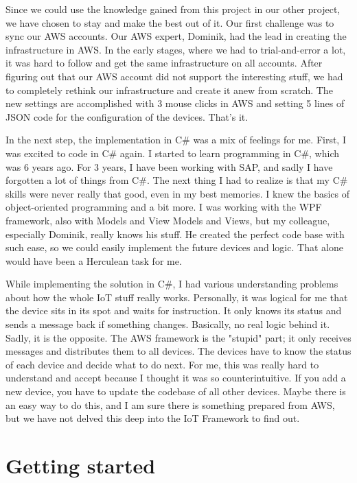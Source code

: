 Since we could use the knowledge gained from this project in our other project, we have chosen to stay and make the best out of it. 
Our first challenge was to sync our AWS accounts. 
Our AWS expert, Dominik, had the lead in creating the infrastructure in AWS. 
In the early stages, where we had to trial-and-error a lot, it was hard to follow and get the same infrastructure on all accounts. 
After figuring out that our AWS account did not support the interesting stuff, we had to completely rethink our infrastructure and create it anew from scratch. 
The new settings are accomplished with 3 mouse clicks in AWS and setting 5 lines of JSON code for the configuration of the devices. That's it.

In the next step, the implementation in C\# was a mix of feelings for me. 
First, I was excited to code in C\# again. 
I started to learn programming in C\#, which was 6 years ago. 
For 3 years, I have been working with SAP, and sadly I have forgotten a lot of things from C\#. 
The next thing I had to realize is that my C\# skills were never really that good, even in my best memories. 
I knew the basics of object-oriented programming and a bit more. 
I was working with the WPF framework, also with Models and View Models and Views, but my colleague, especially Dominik, really knows his stuff. 
He created the perfect code base with such ease, so we could easily implement the future devices and logic. 
That alone would have been a Herculean task for me.

While implementing the solution in C\#, I had various understanding problems about how the whole IoT stuff really works. 
Personally, it was logical for me that the device sits in its spot and waits for instruction. 
It only knows its status and sends a message back if something changes. 
Basically, no real logic behind it. Sadly, it is the opposite. 
The AWS framework is the "stupid" part; it only receives messages and distributes them to all devices.
The devices have to know the status of each device and decide what to do next. 
For me, this was really hard to understand and accept because I thought it was so counterintuitive. 
If you add a new device, you have to update the codebase of all other devices. 
Maybe there is an easy way to do this, and I am sure there is something prepared from AWS, but we have not delved this deep into the IoT Framework to find out.

\section{Getting started}

